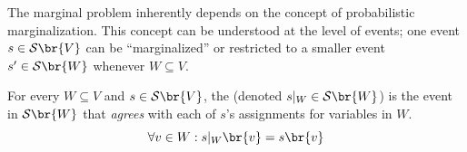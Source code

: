 \documentclass[aps, 10pt, english, twoside, pra, nofootinbib, tightenlines, longbibliography, superscriptaddress]{revtex4-1}
\renewcommand{\Events}[1]{\mathcal{S}\br{#1}} %
\begin{document}
    The marginal problem inherently depends on the concept of probabilistic marginalization. This concept can be understood at the level of events; one event $s \in \Events{V}$ can be ``marginalized'' or restricted to a smaller event $s' \in \Events{W}$ whenever $W \subseteq V$.
    \begin{definition}
    \label{def:section_restriction}
    For every $W \subseteq V$ and $s \in \Events{V}$, the  (denoted $s|_{W} \in \Events{W}$) is the event in $\Events{W}$ that \textit{agrees} with each of $s$'s assignments for variables in $W$.
    \[ \forall v \in W : s|_{W}\br{v} = s\br{v} \]
    \end{definition}

\end{document}

